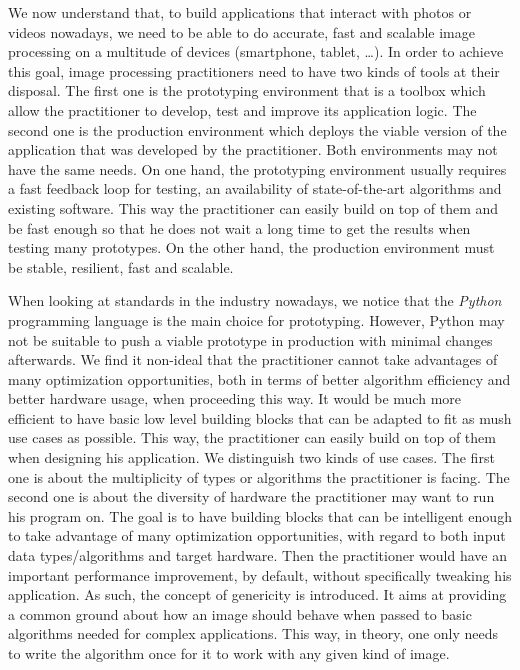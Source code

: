 We now understand that, to build applications that interact with photos or videos nowadays, we need to be able to do
accurate, fast and scalable image processing on a multitude of devices (smartphone, tablet, \ldots). In order to achieve
this goal, image processing practitioners need to have two kinds of tools at their disposal. The first one is the
prototyping environment that is a toolbox which allow the practitioner to develop, test and improve its application
logic. The second one is the production environment which deploys the viable version of the application that was
developed by the practitioner. Both environments may not have the same needs. On one hand, the prototyping environment
usually requires a fast feedback loop for testing, an availability of state-of-the-art algorithms and existing software.
This way the practitioner can easily build on top of them and be fast enough so that he does not wait a long time to get
the results when testing many prototypes. On the other hand, the production environment must be stable, resilient, fast
and scalable.

When looking at standards in the industry nowadays, we notice that the \emph{Python} programming language is the main
choice for prototyping. However, Python may not be suitable to push a viable prototype in production with minimal
changes afterwards. We find it non-ideal that the practitioner cannot take advantages of many optimization
opportunities, both in terms of better algorithm efficiency and better hardware usage, when proceeding this way. It
would be much more efficient to have basic low level building blocks that can be adapted to fit as mush use cases as
possible. This way, the practitioner can easily build on top of them when designing his application. We distinguish two
kinds of use cases. The first one is about the multiplicity of types or algorithms the practitioner is facing. The
second one is about the diversity of hardware the practitioner may want to run his program on. The goal is to have
building blocks that can be intelligent enough to take advantage of many optimization opportunities, with regard to both
input data types/algorithms and target hardware. Then the practitioner would have an important performance improvement,
by default, without specifically tweaking his application. As such, the concept of genericity is introduced. It aims at
providing a common ground about how an image should behave when passed to basic algorithms needed for complex
applications. This way, in theory, one only needs to write the algorithm once for it to work with any given kind of
image.


